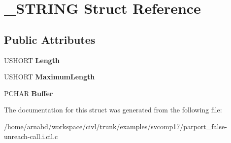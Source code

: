 \hypertarget{struct__STRING}{}\section{\+\_\+\+S\+T\+R\+I\+N\+G Struct Reference}
\label{struct__STRING}
\subsection*{Public Attributes}
\begin{DoxyCompactItemize}
\item 
\hypertarget{struct__STRING_a42053951503fd821638234bd01a1c6c7}{}U\+S\+H\+O\+R\+T {\bfseries Length}\label{struct__STRING_a42053951503fd821638234bd01a1c6c7}

\item 
\hypertarget{struct__STRING_a51da46a492a3ce1a490f9fa32bb37c0b}{}U\+S\+H\+O\+R\+T {\bfseries Maximum\+Length}\label{struct__STRING_a51da46a492a3ce1a490f9fa32bb37c0b}

\item 
\hypertarget{struct__STRING_aaaaa56a4176d7ae875eaea419d56799f}{}P\+C\+H\+A\+R {\bfseries Buffer}\label{struct__STRING_aaaaa56a4176d7ae875eaea419d56799f}

\end{DoxyCompactItemize}


The documentation for this struct was generated from the following file\+:\begin{DoxyCompactItemize}
\item 
/home/arnabd/workspace/civl/trunk/examples/svcomp17/parport\+\_\+false-\/unreach-\/call.\+i.\+cil.\+c\end{DoxyCompactItemize}
